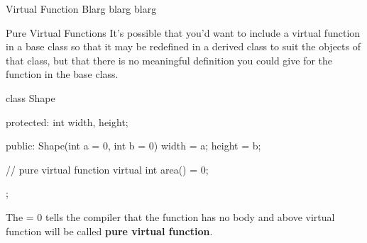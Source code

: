 \documentclass[../lecture5-objectorientation.tex]{subfiles}
\begin{document}

\begin{frame}[fragile]{Virtual Function}
    Blarg blarg blarg
\end{frame}


\begin{frame}[fragile]{Pure Virtual Functions}
    It's possible that you'd want to include a virtual function in a base class so that it may be redefined in a derived class to suit the objects of that class, but that there is no meaningful definition you could give for the function in the base class. \newline

    \begin{cppcode}[lastline=15]
class Shape
{
    protected:
        int width, height;

    public:
        Shape(int a = 0, int b = 0)
        {
            width = a;
            height = b;
        }

        // pure virtual function
        virtual int area() = 0;
};
    \end{cppcode} \newline

    The = 0 tells the compiler that the function has no body and above virtual function will be called \textbf{pure virtual function}.
\end{frame}

\end{document}
